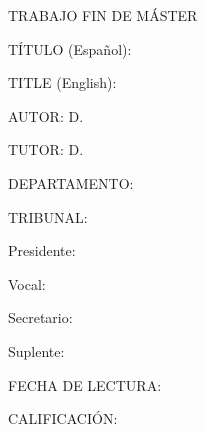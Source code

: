 {\setlength{\parindent}{0cm}
\begin{spanish}
{\scshape\Large TRABAJO FIN DE MÁSTER\par}
\vspace{1cm}
TÍTULO (Español): \myTitleES \par
\vspace{0.3cm}
\end{spanish}
TITLE (English): \myTitleEN \par
\vspace{0.5cm}
\begin{spanish}
AUTOR: D. \myFullname \par
\vspace{0.5cm}
TUTOR: D. \myTutorFullname \par
\vspace{0.5cm}
DEPARTAMENTO: \myDepartment \par
\vspace{2cm}

{\scshape\Large TRIBUNAL:\par}
\vspace{1cm}
Presidente:\par
\vspace{0.5cm}
Vocal:\par
\vspace{0.5cm}
Secretario:\par
\vspace{0.5cm}
Suplente:\par
\vspace{3cm}

FECHA DE LECTURA:\par
\vspace{2cm}
CALIFICACIÓN:\par
\end{spanish}
}

\afterpage{\blankpage}
\cleardoublepage